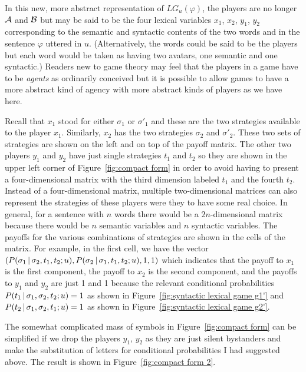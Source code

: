 In this new, more abstract representation of $LG_u(\varphi)$, the players are no longer $\cal A$ and $\cal B$ but may be said to be the four lexical variables $x_1$, $x_2$, $y_1$, $y_2$ corresponding to the semantic and syntactic contents of the two words  and  in the sentence $\varphi$ uttered in $u$. (Alternatively, the words could be said to be the players but each word would be taken as having two avatars, one semantic and one syntactic.) Readers new to game theory may feel that the players in a game have to be \emph{agents} as ordinarily conceived but  it is possible to allow games to have a more abstract kind of agency with more abstract kinds of players as we have here.

Recall that $x_1$ stood for either $\sigma_1$ or $\sigma'_1$ and these are the two strategies available to the player $x_1$. Similarly, $x_2$ has the two strategies $\sigma_2$ and $\sigma'_2$. These two sets of strategies are shown on the left and on top of the payoff matrix. The other two players $y_1$ and $y_2$ have just single strategies $t_1$ and $t_2$ so they are shown in the upper left corner of Figure~\ref{fig:compact form} in order to avoid having to present a four-dimensional matrix with the third dimension labeled $t_1$ and the fourth $t_2$. Instead of a four-dimensional matrix, multiple two-dimensional matrices can also represent the strategies of these players were they to have some real choice. In general, for a sentence with $n$ words there would be a $2n$-dimensional matrix because there would be $n$ semantic variables and $n$ syntactic variables. The payoffs for the various combinations of strategies are shown in the cells of the matrix. For example, in the first cell, we have the vector $(P(\sigma_1 \,|\, \sigma_2, t_1, t_2; u), P(\sigma_2 \,|\, \sigma_1, t_1, t_2; u), 1, 1)$ which indicates that the payoff to $x_1$ is the first component, the payoff to $x_2$ is the second component, and the payoffs to $y_1$ and $y_2$ are just 1 and 1 because the relevant conditional probabilities $P(t_1 \,|\, \sigma_1, \sigma_2, t_2; u) = 1$ as shown in Figure~\ref{fig:syntactic lexical game g1'} and $P(t_2 \,|\, \sigma_1, \sigma_2, t_1; u) = 1$ as shown in Figure~\ref{fig:syntactic lexical game g2'}.

The somewhat complicated mass of symbols in Figure~\ref{fig:compact form} can be simplified if we drop the players $y_1$, $y_2$ as they are just silent bystanders and make the substitution of letters for conditional probabilities I had suggested above. The result is shown in Figure~\ref{fig:compact form 2}.

